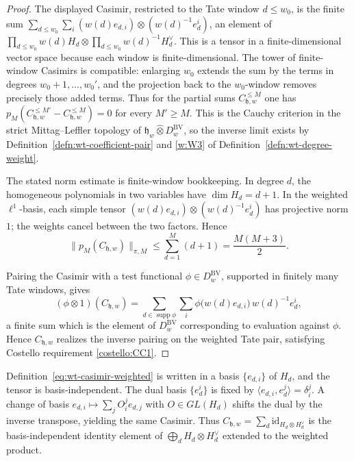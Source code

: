 \begin{proof}
  The displayed Casimir, restricted to the Tate window $d\leq w_0$,
  is the finite sum
  $\sum_{d\leq w_0}\sum_i(w(d)e_{d,i})\otimes(w(d)^{-1}e^i_d)$, an
  element of $\prod_{d\leq w_0}w(d)H_d\otimes\prod_{d\leq w_0}
  w(d)^{-1}H_d^\vee$. This is a tensor in a finite-dimensional vector
  space because each window is finite-dimensional. The tower of
  finite-window Casimirs is compatible: enlarging $w_0$ extends the
  sum by the terms in degrees $w_0+1,\ldots,w_0'$, and the projection
  back to the \(w_0\)-window removes precisely those added terms.  Thus
  for the partial sums \(C_{\mathfrak h,w}^{\leq M}\) one has
  \(p_M(C_{\mathfrak h,w}^{\leq M'}-C_{\mathfrak h,w}^{\leq M})=0\) for
  every \(M'\geq M\).  This is the Cauchy criterion in the strict
  Mittag--Leffler topology of
  \(\mathfrak h_w\widehat\otimes
  D^{\mathrm{BV}}_w\), so the inverse limit exists
  by Definition~\ref{defn:wt-coefficient-pair} and
  \ref{w:W3} of Definition~\ref{defn:wt-degree-weight}.

  The stated norm estimate is finite-window bookkeeping.  In degree
  \(d\), the homogeneous polynomials in two variables have
  \(\dim H_d=d+1\).  In the weighted \(\ell^1\)-basis, each simple tensor
  \((w(d)e_{d,i})\otimes(w(d)^{-1}e^i_d)\) has projective norm \(1\);
  the weights cancel between the two factors.  Hence
  \[
    \bigl\|p_M(C_{\mathfrak h,w})\bigr\|_{\pi,M}
      \leq
    \sum_{d=1}^{M}(d+1)
      =
    \frac{M(M+3)}{2}.
  \]

  Pairing the Casimir with a test functional $\phi\in
  D^{\mathrm{BV}}_w$, supported in finitely many
  Tate windows, gives
  \[
    (\phi\otimes 1)(C_{\mathfrak h,w})
      =
      \sum_{d\in \operatorname{supp}\phi}\sum_i
      \phi\!\bigl(w(d)e_{d,i}\bigr)\,w(d)^{-1}e^i_d,
  \]
  a finite sum which is the element of
  \(D^{\mathrm{BV}}_w\) corresponding to evaluation
  against \(\phi\). Hence $C_{\mathfrak h,w}$
  realizes the inverse pairing on the weighted Tate pair, satisfying
  Costello requirement \ref{costello:CC1}.
\end{proof}

\begin{rmk}\label{rmk:wt-basis-independence}
  Definition~\eqref{eq:wt-casimir-weighted} is written in a basis
  $\{e_{d,i}\}$ of $H_d$, and the tensor is basis-independent. The dual basis
  $\{e^i_d\}$ is fixed by $\langle e_{d,i},e^j_d\rangle=\delta_i^j$.
  A change of basis $e_{d,i}\mapsto\sum_j O_i^je_{d,j}$
  with $O\in GL(H_d)$ shifts the dual by the inverse transpose,
  yielding the same Casimir. Thus
  $C_{\mathfrak h,w}=\sum_d\mathrm{id}_{H_d\otimes H_d^\vee}$ is the
  basis-independent identity element of $\bigoplus_d H_d\otimes
  H_d^\vee$ extended to the weighted product.
\end{rmk}

